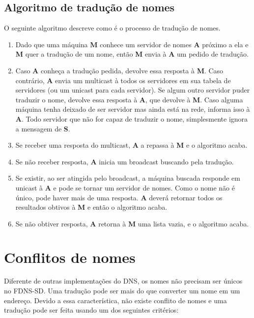     \subsection{Algoritmo de tradução de nomes}
        O seguinte algoritmo descreve como é o processo de tradução de nomes.
        \begin{enumerate}
            \item Dado que uma máquina \textbf{M} conhece um servidor de nomes
            \textbf{A} próximo a ela e \textbf{M} quer a tradução de um nome,
            então \textbf{M} envia à \textbf{A} um pedido de tradução.
            \item Caso \textbf{A} conheça a tradução pedida, devolve essa resposta
            à \textbf{M}. Caso contrário, \textbf{A} envia um multicast à todos
            os servidores em sua tabela de servidores (ou um unicast para cada
            servidor). Se algum outro servidor
            puder traduzir o nome, devolve essa resposta à \textbf{A}, que devolve
            à \textbf{M}. Caso alguma máquina tenha deixado de ser servidor mas
            ainda está na rede, informa isso à \textbf{A}. Todo servidor que não
            for capaz de traduzir o nome, simplesmente ignora a mensagem de \textbf{S}.
            \item Se receber uma resposta do multicast, \textbf{A} a repassa à
            \textbf{M} e o algoritmo acaba.
            \item Se não receber resposta, \textbf{A} inicia um broadcast buscando
            pela tradução. 
            \item Se existir, ao ser atingida pelo broadcast, a máquina buscada
            responde em unicast à \textbf{A} e
            pode se tornar um servidor de nomes. Como o nome não é único, pode
            haver mais de uma resposta. \textbf{A} deverá retornar todos os
            resultados obtivos à \textbf{M} e então o algoritmo acaba.
            \item Se não obtiver resposta, \textbf{A} retorna à \textbf{M} uma
            lista vazia, e o algoritmo acaba.
        \end{enumerate}

\section{Conflitos de nomes}
    Diferente de outras implementações do DNS, os nomes não precisam ser únicos
    no FDNS-SD. Uma tradução pode ser mais do que converter um nome em um endereço.
    Devido a essa característica, não existe conflito de nomes e uma tradução pode
    ser feita usando um dos seguintes critérios:
    
